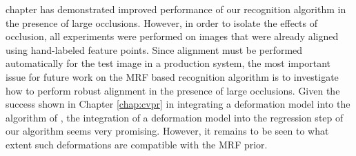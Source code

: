  chapter has demonstrated improved performance of our recognition algorithm in the presence of large occlusions.  However, in order to isolate the effects of occlusion, all experiments were performed on images that were already aligned using hand-labeled feature points.  Since alignment must be performed automatically for the test image in a production system, the most important issue for future work on the MRF based recognition algorithm is to investigate how to perform robust alignment in the presence of large occlusions.  Given the success shown in Chapter \ref{chap:cvpr} in integrating a deformation model into the algorithm of \cite{Wright2009-PAMI}, the integration of a deformation model into the regression step of our algorithm \cite{Wagner2009-CVPR} seems very promising. 
However, it remains to be seen to what extent such deformations are compatible with the MRF prior.  

